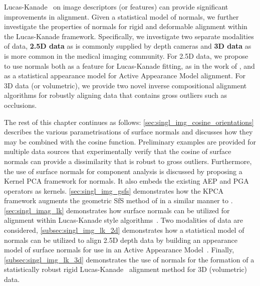 Lucas-Kanade~\cite{lucas1981iterative} on image descriptors (or features) can
provide significant improvements in alignment. Given a statistical model
of normals, we further investigate the properties of normals for rigid and
deformable alignment within the Lucas-Kanade framework. Specifically, we
investigate two separate modalities of data, \textbf{2.5D data} as is
commonly supplied by depth cameras and \textbf{3D data} as is more common
in the medical imaging community. For 2.5D data, we propose to use normals both
as a feature for Lucas-Kanade fitting, as in the work of
\citet{antonakos2015feature}, and as a statistical appearance model for Active
Appearance Model alignment. For 3D data (or volumetric), we provide two novel
inverse compositional alignment~\cite{baker2004lucas} algorithms for robustly
aligning data that contains gross outliers such as occlusions.

The rest of this chapter continues as follows:
\cref{sec:singl_img_cosine_orientations} describes the various
parametrisations of surface normals and discusses how they may be combined with
the cosine function. Preliminary examples are provided for multiple
data sources that experimentally verify that the cosine of surface normals
can provide a dissimilarity that is robust to gross outliers. Furthermore,
the use of surface normals for component analysis is discussed by proposing a
Kernel PCA framework for normals. It also embeds the existing AEP and PGA
operators as kernels.
\cref{sec:singl_img_gsfs} demonstrates how the KPCA framework augments
the geometric SfS method of \citet{worthington1999new} in a similar manner to
\citet{smith2006recovering}.
\cref{sec:singl_imag_lk} demonstrates how surface
normals can be utilized for alignment within Lucas-Kanade style
algorithms~\cite{lucas1981iterative}. Two modalities of data are considered,
\cref{subsec:singl_img_lk_2d} demonstrates how a statistical model of normals
can be utilized to align 2.5D depth data by building an appearance model of
surface normals for use in an Active Appearance Model~\cite{cootes2001active}.
Finally, \cref{subsec:singl_img_lk_3d} demonstrates the use of normals for the
formation of a statistically robust rigid Lucas-Kanade~\cite{lucas1981iterative}
alignment method for 3D (volumetric) data.
{





}
\stopcontents[chapters]
